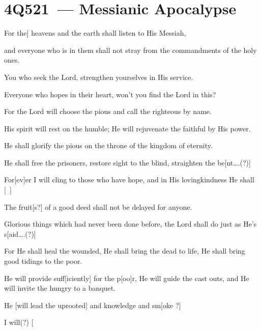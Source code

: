\section{4Q521~--- Messianic Apocalypse}\label{dss:4q521}

\begin{inparaenum}
  {\noindent{} For the] heavens and the earth shall listen to His Messiah,}%

  {\noindent{} and everyone who is in them shall not stray from the commandments of the holy ones.}%

  {\noindent{} You who seek the Lord, strengthen yourselves in His service.}%

  {\noindent{} Everyone who hopes in their heart, won't you find the Lord in this?}%

  {\noindent{} For the Lord will choose the pious and call the righteous by name.}%

  {\noindent{} His spirit will rest on the humble; He will rejuvenate the faithful by His power.}%

  {\noindent{} He shall glorify the pious on the throne of the kingdom of eternity.}%

  {\noindent{} He shall free the prisoners, restore sight to the blind, straighten the be[nt\dots.(?)]}%

  {\noindent{} For[ev]er I will cling to those who have hope, and in His lovingkindness He shall [\ ]}%

  {\noindent{} The fruit[s?] of a good deed shall not be delayed for anyone.}%

  {\noindent{} Glorious things which had never been done before, the Lord shall do just as He's s[aid\dots.(?)]}%

  {\noindent{} For He shall heal the wounded, He shall bring the dead to life, He shall bring good tidings to the poor.}%

  {\noindent{} He will provide suff[iciently] for the p[oo]r, He will guide the cast outs, and He will invite the hungry to a banquet.}%

  {\noindent{} He [will lead the uprooted] and knowledge and sm[oke ?]}%

  {\noindent{} I will(?) [}%
\end{inparaenum}
